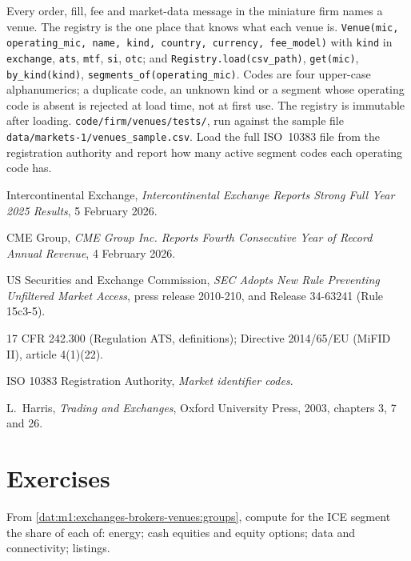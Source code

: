 \begin{build}
 Every order, fill, fee and market-data message in the
miniature firm names a venue. The registry is the one place that knows what
each venue is.
 \texttt{Venue(mic, operating\_mic, name, kind, country,
currency, fee\_model)} with \texttt{kind} in \texttt{exchange}, \texttt{ats},
\texttt{mtf}, \texttt{si}, \texttt{otc}; and
\texttt{Registry.load(csv\_path)}, \texttt{get(mic)},
\texttt{by\_kind(kind)}, \texttt{segments\_of(operating\_mic)}.
 Codes are four upper-case alphanumerics; a duplicate code, an
unknown kind or a segment whose operating code is absent is rejected at load
time, not at first use. The registry is immutable after loading.
 \texttt{code/firm/venues/tests/}, run against the
sample file \texttt{data/markets-1/venues\_sample.csv}.
 Load the full ISO~10383 file from the registration
authority and report how many active segment codes each operating code has.
\end{build}

\begin{omsources}
\item Intercontinental Exchange, \emph{Intercontinental Exchange Reports
Strong Full Year 2025 Results}, 5 February 2026.
\item CME Group, \emph{CME Group Inc. Reports Fourth Consecutive Year of
Record Annual Revenue}, 4 February 2026.
\item US Securities and Exchange Commission, \emph{SEC Adopts New Rule
Preventing Unfiltered Market Access}, press release 2010-210, and Release
34-63241 (Rule 15c3-5).
\item 17 CFR 242.300 (Regulation ATS, definitions); Directive 2014/65/EU
(MiFID II), article 4(1)(22).
\item ISO 10383 Registration Authority, \emph{Market identifier codes}.
\item L.~Harris, \emph{Trading and Exchanges}, Oxford University Press, 2003,
chapters 3, 7 and 26.
\end{omsources}

\section{Exercises}

\begin{exercise}[$\star$]\label{exo:m1:exchanges-brokers-venues:1}
From \cref{dat:m1:exchanges-brokers-venues:groups}, compute for the ICE
 segment the share of each of: energy; cash equities and equity
options; data and connectivity; listings.
\end{exercise}

